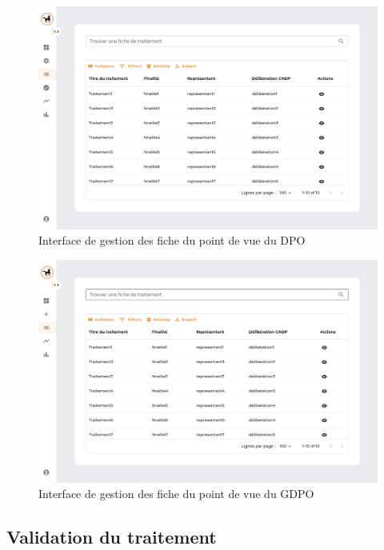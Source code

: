 \begin{figure}[H]
    \centering
    \includegraphics[width=\textwidth]{images/guis/fiches/fiches-dpo.png}
    \caption{Interface de gestion des fiche du point de vue du DPO}
\end{figure}

\begin{figure}[H]
    \centering
    \includegraphics[width=\textwidth]{images/guis/fiches/fiches-gdpo.png}
    \caption{Interface de gestion des fiche du point de vue du GDPO}
\end{figure}

\clearpage

\subsection{Validation du traitement}

